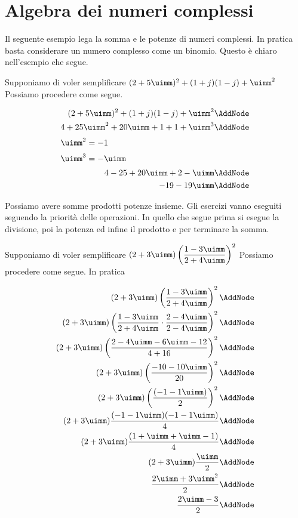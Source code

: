 \section{Algebra dei numeri complessi}
\label{sec:AlgebraNumeriComplessi}
Il seguente esempio lega la somma e le potenze di numeri complessi. In pratica basta considerare un numero complesso come un binomio. Questo è chiaro nell'esempio che segue.
\begin{esempio}
	Supponiamo di voler semplificare $(2+5\uimm)^2+(1+j)(1-j)+\uimm^2 $ Possiamo procedere come segue.
	\begin{NodesList} [margin=4cm]
		\begin{align*}
			(2+5\uimm)^2+(1+j)(1-j)+\uimm^2 \AddNode\\
			4+25\uimm^2+20\uimm+1+1+\uimm^3\AddNode\\
			\intertext{\hfil $\uimm^2=-1$}
			\intertext{\hfil $\uimm^3=-\uimm$}
			4-25+20\uimm+2-\uimm\AddNode\\
			-19-19\uimm\AddNode
		\end{align*}
	\end{NodesList}
\end{esempio}
Possiamo avere somme prodotti potenze insieme. Gli esercizi vanno eseguiti seguendo la priorità delle operazioni. In quello che segue  prima si esegue la divisione, poi la potenza ed infine il prodotto e per terminare la somma. 
\begin{esempio}
Supponiamo di voler semplificare $(2+3\uimm)\left(\dfrac{1-3\uimm}{2+4\uimm}\right)^2 $ Possiamo procedere come segue. In pratica
	\begin{NodesList} [margin=4cm]
		\begin{align*}
			(2+3\uimm)\left(\dfrac{1-3\uimm}{2+4\uimm}\right)^2 \AddNode\\
			(2+3\uimm)\left(\dfrac{1-3\uimm}{2+4\uimm}\cdot\dfrac{2-4\uimm}{2-4\uimm}\right)^2\AddNode\\
			(2+3\uimm)\left(\dfrac{2-4\uimm-6\uimm-12}{4+16}\right)^2\AddNode\\
			(2+3\uimm)\left(\dfrac{-10-10\uimm}{20}\right)^2\AddNode\\
			(2+3\uimm)\left(\dfrac{(-1-1\uimm)}{2}\right)^2\AddNode\\
			(2+3\uimm)\dfrac{(-1-1\uimm)(-1-1\uimm)}{4}\AddNode\\
			(2+3\uimm)\dfrac{(1+\uimm+\uimm-1)}{4}\AddNode\\
			(2+3\uimm)\dfrac{\uimm}{2}\AddNode\\
			\dfrac{2\uimm+3\uimm^2}{2}\AddNode\\
			\dfrac{2\uimm-3}{2}\AddNode
		\end{align*}
	\end{NodesList}
\end{esempio}












